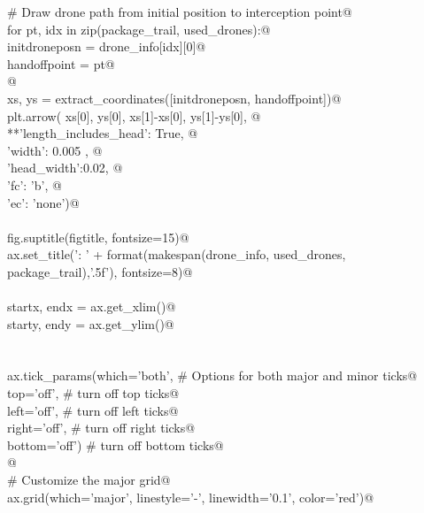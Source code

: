 \documentclass[10.0pt]{report}
\begin{document}
\begin{flushleft}
\begin{list}{}{}
\mbox{}\verb@    # Draw drone path from initial position to interception point@\\
\mbox{}\verb@    for pt, idx in zip(package_trail, used_drones):@\\
\mbox{}\verb@         initdroneposn = drone_info[idx][0]@\\
\mbox{}\verb@         handoffpoint  = pt@\\
\mbox{}\verb@    @\\
\mbox{}\verb@         xs, ys = extract_coordinates([initdroneposn, handoffpoint])@\\
\mbox{}\verb@         plt.arrow( xs[0], ys[0], xs[1]-xs[0], ys[1]-ys[0], @\\
\mbox{}\verb@                    **{'length_includes_head': True, @\\
\mbox{}\verb@                       'width': 0.005 , @\\
\mbox{}\verb@                       'head_width':0.02, @\\
\mbox{}\verb@                       'fc': 'b', @\\
\mbox{}\verb@                       'ec': 'none'})@\\
\mbox{}\verb@@\\
\mbox{}\verb@    fig.suptitle(figtitle, fontsize=15)@\\
\mbox{}\verb@    ax.set_title('\nMakespan: ' + format(makespan(drone_info, used_drones, package_trail),'.5f'), fontsize=8)@\\
\mbox{}\verb@@\\
\mbox{}\verb@    startx, endx = ax.get_xlim()@\\
\mbox{}\verb@    starty, endy = ax.get_ylim()@\\
\mbox{}\verb@@\\
\mbox{}\verb@@\\
\mbox{}\verb@    ax.tick_params(which='both', # Options for both major and minor ticks@\\
\mbox{}\verb@                top='off', # turn off top ticks@\\
\mbox{}\verb@                left='off', # turn off left ticks@\\
\mbox{}\verb@                right='off',  # turn off right ticks@\\
\mbox{}\verb@                bottom='off') # turn off bottom ticks@\\
\mbox{}\verb@    @\\
\mbox{}\verb@    # Customize the major grid@\\
\mbox{}\verb@    ax.grid(which='major', linestyle='-', linewidth='0.1', color='red')@\\

\end{list}
\end{flushleft}
\end{document}
